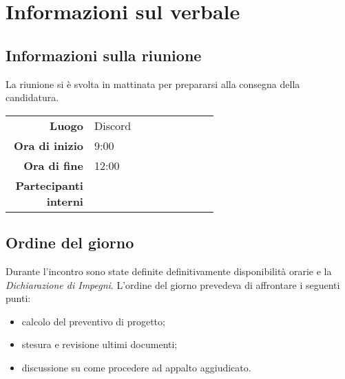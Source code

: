 \section{Informazioni sul verbale}

\subsection{Informazioni sulla riunione}
La riunione si è svolta in mattinata per prepararsi alla consegna della candidatura.

\begin{center}
	\begin{tabular}{r|p{0.6\linewidth}}
		\toprule
		\textbf{Luogo} & Discord \\
		\textbf{Ora di inizio} & 9:00 \\
		\textbf{Ora di fine} & 12:00 \\
		\textbf{Partecipanti interni} & \groupTeam
	\end{tabular}
\end{center}

\medskip

\subsection{Ordine del giorno}
Durante l'incontro sono state definite definitivamente disponibilità orarie e la \textit{Dichiarazione di Impegni}. L'ordine del giorno prevedeva di affrontare i seguenti punti:
\begin{itemize}
	\item calcolo del preventivo di progetto;
	\item stesura e revisione ultimi documenti;
	\item discussione su come procedere ad appalto aggiudicato.
\end{itemize}
